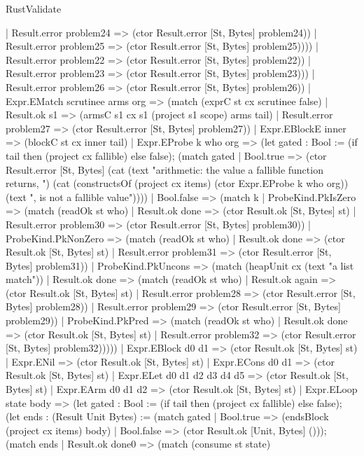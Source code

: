 \begin{lexlean}{RustValidate}
\begin{semanticmodule}
{              | Result.error problem24 => (ctor Result.error [St, Bytes] problem24))
            | Result.error problem25 => (ctor Result.error [St, Bytes] problem25))))
          | Result.error problem22 => (ctor Result.error [St, Bytes] problem22))
        | Result.error problem23 => (ctor Result.error [St, Bytes] problem23)))
      | Result.error problem26 => (ctor Result.error [St, Bytes] problem26))
    | Expr.EMatch scrutinee arms org => (match (exprC st cx scrutinee false)
      | Result.ok s1 => (armsC s1 cx s1 (project s1 scope) arms tail)
      | Result.error problem27 => (ctor Result.error [St, Bytes] problem27))
    | Expr.EBlockE inner => (blockC st cx inner tail)
    | Expr.EProbe k who org => (let gated : Bool := (if tail then (project cx fallible) else false); (match gated
      | Bool.true => (ctor Result.error [St, Bytes] (cat (text "arithmetic: the value a fallible function returns, ") (cat (constructsOf (project cx items) (ctor Expr.EProbe k who org)) (text ", is not a fallible value"))))
      | Bool.false => (match k
        | ProbeKind.PkIsZero => (match (readOk st who)
          | Result.ok done => (ctor Result.ok [St, Bytes] st)
          | Result.error problem30 => (ctor Result.error [St, Bytes] problem30))
        | ProbeKind.PkNonZero => (match (readOk st who)
          | Result.ok done => (ctor Result.ok [St, Bytes] st)
          | Result.error problem31 => (ctor Result.error [St, Bytes] problem31))
        | ProbeKind.PkUncons => (match (heapUnit cx (text "a list match"))
          | Result.ok done => (match (readOk st who)
            | Result.ok again => (ctor Result.ok [St, Bytes] st)
            | Result.error problem28 => (ctor Result.error [St, Bytes] problem28))
          | Result.error problem29 => (ctor Result.error [St, Bytes] problem29))
        | ProbeKind.PkPred => (match (readOk st who)
          | Result.ok done => (ctor Result.ok [St, Bytes] st)
          | Result.error problem32 => (ctor Result.error [St, Bytes] problem32)))))
    | Expr.EBlock d0 d1 => (ctor Result.ok [St, Bytes] st)
    | Expr.ENil => (ctor Result.ok [St, Bytes] st)
    | Expr.ECons d0 d1 => (ctor Result.ok [St, Bytes] st)
    | Expr.ELet d0 d1 d2 d3 d4 d5 => (ctor Result.ok [St, Bytes] st)
    | Expr.EArm d0 d1 d2 => (ctor Result.ok [St, Bytes] st)
    | Expr.ELoop state body => (let gated : Bool := (if tail then (project cx fallible) else false); (let ends : (Result Unit Bytes) := (match gated
      | Bool.true => (endsBlock (project cx items) body)
      | Bool.false => (ctor Result.ok [Unit, Bytes] ())); (match ends
      | Result.ok done0 => (match (consume st state)
}
\end{semanticmodule}
\end{lexlean}

